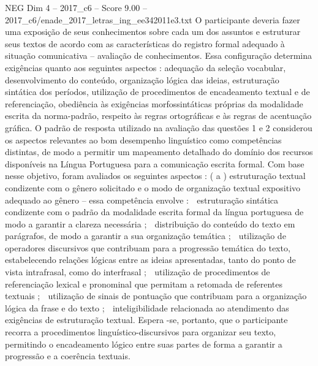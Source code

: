 \begin{textsample}{NEG Dim 4 – 2017\_c6 – Score 9.00 – 2017\_c6/enade\_2017\_letras\_ing\_ee342011e3.txt}
O participante deveria fazer uma exposição de seus conhecimentos sobre cada um dos assuntos e estruturar seus textos de acordo com as características do registro formal adequado à situação comunicativa – avaliação de conhecimentos.
Essa configuração determina exigências quanto aos seguintes aspectos : adequação da seleção vocabular, desenvolvimento do conteúdo, organização lógica das ideias, estruturação sintática dos períodos, utilização de procedimentos de encadeamento textual e de referenciação, obediência às exigências morfossintáticas próprias da modalidade escrita da norma-padrão, respeito às regras ortográficas e às regras de acentuação gráfica.
O padrão de resposta utilizado na avaliação das questões 1 e 2 considerou os aspectos relevantes ao bom desempenho linguístico como competências distintas, de modo a permitir um mapeamento detalhado do domínio dos recursos disponíveis na Língua Portuguesa para a comunicação escrita formal.
Com base nesse objetivo, foram avaliados os seguintes aspectos : ( a ) estruturação textual condizente com o gênero solicitado e o modo de organização textual expositivo adequado ao gênero – essa competência envolve :  estruturação sintática condizente com o padrão da modalidade escrita formal da língua portuguesa de modo a garantir a clareza necessária ;  distribuição do conteúdo do texto em parágrafos, de modo a garantir a sua organização temática ;  utilização de operadores discursivos que contribuam para a progressão temática do texto, estabelecendo relações lógicas entre as ideias apresentadas, tanto do ponto de vista intrafrasal, como do interfrasal ;  utilização de procedimentos de referenciação lexical e pronominal que permitam a retomada de referentes textuais ;  utilização de sinais de pontuação que contribuam para a organização lógica da frase e do texto ;  inteligibilidade relacionada ao atendimento das exigências de estruturação textual.
Espera -se, portanto, que o participante recorra a procedimentos linguístico-discursivos para organizar seu texto, permitindo o encadeamento lógico entre suas partes de forma a garantir a progressão e a coerência textuais.

\end{textsample}
